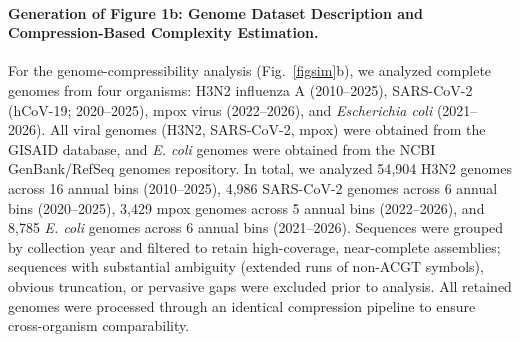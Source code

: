 


\paragraph{Generation of Figure 1b: Genome Dataset Description and Compression-Based Complexity Estimation.}
For the genome-compressibility analysis (Fig.~\ref{figsim}b), we analyzed complete genomes from four organisms: H3N2 influenza A (2010--2025), SARS-CoV-2 (hCoV-19; 2020--2025), mpox virus (2022--2026), and \textit{Escherichia coli} (2021--2026). All viral genomes (H3N2, SARS-CoV-2, mpox) were obtained from the GISAID database, and \textit{E. coli} genomes were obtained from the NCBI GenBank/RefSeq genomes repository. In total, we analyzed 54{,}904 H3N2 genomes across 16 annual bins (2010--2025), 4{,}986 SARS-CoV-2 genomes across 6 annual bins (2020--2025), 3{,}429 mpox genomes across 5 annual bins (2022--2026), and 8{,}785 \textit{E. coli} genomes across 6 annual bins (2021--2026). Sequences were grouped by collection year and filtered to retain high-coverage, near-complete assemblies; sequences with substantial ambiguity (extended runs of non-ACGT symbols), obvious truncation, or pervasive gaps were excluded prior to analysis. All retained genomes were processed through an identical compression pipeline to ensure cross-organism comparability.

